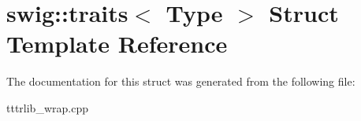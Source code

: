 \hypertarget{structswig_1_1traits}{}\section{swig\+:\+:traits$<$ Type $>$ Struct Template Reference}
\label{structswig_1_1traits}


The documentation for this struct was generated from the following file\+:\begin{DoxyCompactItemize}
\item 
tttrlib\+\_\+wrap.\+cpp\end{DoxyCompactItemize}
